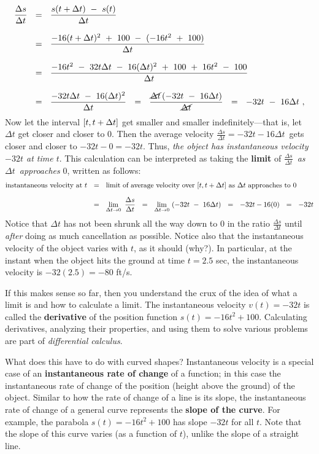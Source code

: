 \begin{align*}
 \dfrac{\Delta s}{\Delta t} ~~&=~~ \dfrac{s(t + \Delta t) ~-~ s(t)}
  {\Delta t}\\[8pt]
  &=~~ \dfrac{-16(t+\Delta t)^2 ~+~ 100 ~-~ (-16t^2 ~+~ 100)}{\Delta t}\\[8pt]
  &=~~ \dfrac{-16t^2 ~-~ 32t\Delta t ~-~ 16(\Delta t)^2 ~+~ 100 ~+~ 16t^2
   ~-~ 100}{\Delta t}\\[8pt]
  &=~~ \dfrac{-32t\Delta t ~-~ 16(\Delta t)^2}{\Delta t}
   ~~=~~ \dfrac{\cancel{\Delta t} \,(-32t ~-~ 16\Delta t)}
          {\cancel{\Delta t}} ~~=~~ -32t ~-~ 16\Delta t ~,
\end{align*}
Now let the interval $\lbrack t,t+\Delta t \rbrack$ get smaller and
smaller indefinitely---that is, let $\Delta t$ get closer and closer to 0.
Then the average velocity $\frac{\Delta s}{\Delta t} = -32t - 16\Delta t\,$
gets closer and closer to $-32t - 0 = -32t$. Thus, \emph{the object has
instantaneous velocity $-32t$ at time $t$}. This calculation can be
interpreted as taking the \textbf{limit} of
$\frac{\Delta s}{\Delta t}\,$ \emph{as} $\Delta t\,$ \emph{approaches} $0$,
written as follows:
\begin{align*}
 \text{instantaneous velocity at $t$} ~~&=~~
  \text{limit of average velocity over $\lbrack t,t+\Delta t \rbrack$
  as $\Delta t$ approaches to 0}\\[6pt]
  &=~~ \lim_{\Delta t \to 0} ~\frac{\Delta s}{\Delta t}
  ~~=~~ \lim_{\Delta t \to 0} ~(-32t ~-~ 16\Delta t) ~~=~~ -32t - 16(0) ~~=~~ -32t
\end{align*}
Notice that $\Delta t$ has not been shrunk all the way down to $0$ in the
ratio $\frac{\Delta s}{\Delta t}$ until \emph{after} doing as much cancellation
as possible. Notice also that the instantaneous velocity of the object
varies with $t$, as it should (why?). In particular, at the instant when the
object hits the ground at time $t = 2.5$ sec, the instantaneous velocity is
$-32(2.5) = -80$ ft/s.

If this makes sense so far, then you understand the crux of the idea of what a
limit is and how to calculate a limit. The instantaneous velocity $v(t) = -32t$
is called the \textbf{derivative} of the position function $s(t) =-16t^2 + 100$.
Calculating derivatives, analyzing their properties, and using them to solve
various problems are part of \emph{differential calculus}.

What does this have to do with curved shapes? Instantaneous velocity is a
special case of an \textbf{instantaneous rate of change} of a function; in this case the instantaneous rate of change of
the position (height above the ground) of the object. Similar to how the rate
of change of a line is its slope, the instantaneous rate of change of a general
curve represents the \textbf{slope of the curve}. For example, the parabola
$s(t) = -16t^2 + 100$ has slope $-32t$ for all $t$. Note that the slope of this
curve varies (as a function of $t$), unlike the slope of a straight line.

